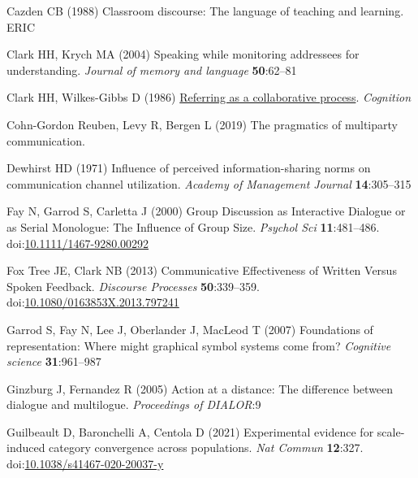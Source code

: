 \documentclass[
  english,
  a4paper,
]{article}
\newlength{\cslhangindent}
\newlength{\cslentryspacingunit} %
\newenvironment{CSLReferences}[2] %
 {%
  \setlength{\parindent}{0pt}
  \ifodd #1
  \let\oldpar\par
  \def\par{\hangindent=\cslhangindent\oldpar}
  \fi
  \setlength{\parskip}{#2\cslentryspacingunit}
 }%
 {}
\begin{document}
\begin{CSLReferences}{1}{0}
\leavevmode{}%
Cazden CB (1988) Classroom discourse: The language of teaching and learning. ERIC

\leavevmode{}%
Clark HH, Krych MA (2004) Speaking while monitoring addressees for understanding. \emph{Journal of memory and language} \textbf{50}:62--81

\leavevmode{}%
Clark HH, Wilkes-Gibbs D (1986) \href{http://www.speech.kth.se/~edlund/bielefeld/references/clark-and-wilkes-gibbs-1986.pdf}{Referring as a collaborative process}. \emph{Cognition}

\leavevmode{}%
Cohn-Gordon Reuben, Levy R, Bergen L (2019) The pragmatics of multiparty communication.

\leavevmode{}%
Dewhirst HD (1971) Influence of perceived information-sharing norms on communication channel utilization. \emph{Academy of Management Journal} \textbf{14}:305--315

\leavevmode{}%
Fay N, Garrod S, Carletta J (2000) Group {Discussion} as {Interactive Dialogue} or as {Serial Monologue}: {The Influence} of {Group Size}. \emph{Psychol Sci} \textbf{11}:481--486. doi:\href{https://doi.org/10.1111/1467-9280.00292}{10.1111/1467-9280.00292}

\leavevmode{}%
Fox Tree JE, Clark NB (2013) Communicative {Effectiveness} of {Written Versus Spoken Feedback}. \emph{Discourse Processes} \textbf{50}:339--359. doi:\href{https://doi.org/10.1080/0163853X.2013.797241}{10.1080/0163853X.2013.797241}

\leavevmode{}%
Garrod S, Fay N, Lee J, Oberlander J, MacLeod T (2007) Foundations of representation: Where might graphical symbol systems come from? \emph{Cognitive science} \textbf{31}:961--987

\leavevmode{}%
Ginzburg J, Fernandez R (2005) Action at a distance: The difference between dialogue and multilogue. \emph{Proceedings of DIALOR}:9

\leavevmode{}%
Guilbeault D, Baronchelli A, Centola D (2021) Experimental evidence for scale-induced category convergence across populations. \emph{Nat Commun} \textbf{12}:327. doi:\href{https://doi.org/10.1038/s41467-020-20037-y}{10.1038/s41467-020-20037-y}


\end{CSLReferences}
\end{document}
